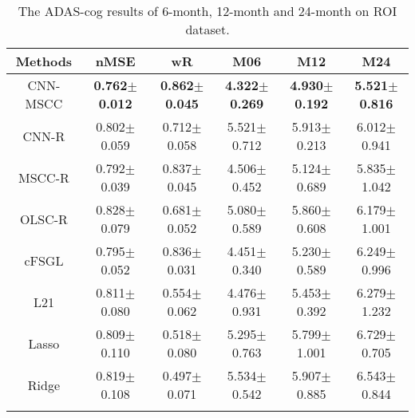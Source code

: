 \documentclass[10pt,twocolumn,letterpaper]{article}
\begin{document}
\begin{table*}[t]
\centering
\caption{The ADAS-cog results of 6-month, 12-month and 24-month on ROI dataset.}
\label{tab:3}
\vspace{-1em}
\begin{tabular}{cccccc}
\toprule
Methods & nMSE & wR & M06 & M12 & M24\\\hline
CNN-MSCC & \textbf{0.762$\pm$0.012} & \textbf{0.862$\pm$0.045} & \textbf{4.322$\pm$0.269}&\textbf{4.930$\pm$0.192}&\textbf{5.521$\pm$0.816}\\
CNN-R & 0.802$\pm$0.059 & 0.712$\pm$0.058 &5.521$\pm$0.712&5.913$\pm$0.213&6.012$\pm$0.941\\
MSCC-R&0.792$\pm$0.039&0.837$\pm$0.045&4.506$\pm$0.452&5.124$\pm$0.689&5.835$\pm$1.042\\
OLSC-R&0.828$\pm$0.079&0.681$\pm$0.052&5.080$\pm$0.589&5.860$\pm$0.608&6.179$\pm$1.001\\
cFSGL&0.795$\pm$0.052&0.836$\pm$0.031&4.451$\pm$0.340&5.230$\pm$0.589&6.249$\pm$0.996\\
L21&0.811$\pm$0.080&0.554$\pm$0.062&4.476$\pm$0.931&5.453$\pm$0.392&6.279$\pm$1.232\\
Lasso&0.809$\pm$0.110&0.518$\pm$0.080&5.295$\pm$0.763&5.799$\pm$1.001&6.729$\pm$0.705\\
Ridge&0.819$\pm$0.108&0.497$\pm$0.071&5.534$\pm$0.542&5.907$\pm$0.885&6.543$\pm$0.844\\
\bottomrule
\vspace{-2em}
\end{tabular}
\end{table*}
\end{document}
